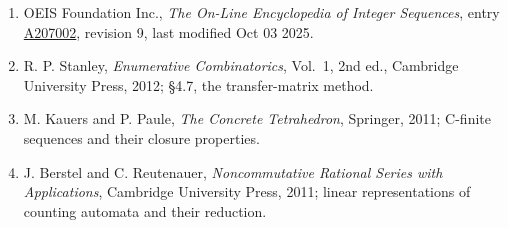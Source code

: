 \documentclass[11pt]{article}
\theoremstyle{definition}
\begin{document}
\begin{enumerate}

\item OEIS Foundation Inc., \emph{The On-Line Encyclopedia of Integer Sequences}, entry \href{https://oeis.org/A207002}{A207002}, revision 9, last modified Oct 03 2025.

\item R. P. Stanley, \emph{Enumerative Combinatorics}, Vol.~1, 2nd ed., Cambridge University Press, 2012; \S4.7, the transfer-matrix method.

\item M. Kauers and P. Paule, \emph{The Concrete Tetrahedron}, Springer, 2011; C-finite sequences and their closure properties.

\item J. Berstel and C. Reutenauer, \emph{Noncommutative Rational Series with Applications}, Cambridge University Press, 2011; linear representations of counting automata and their reduction.

\end{enumerate}
\end{document}
